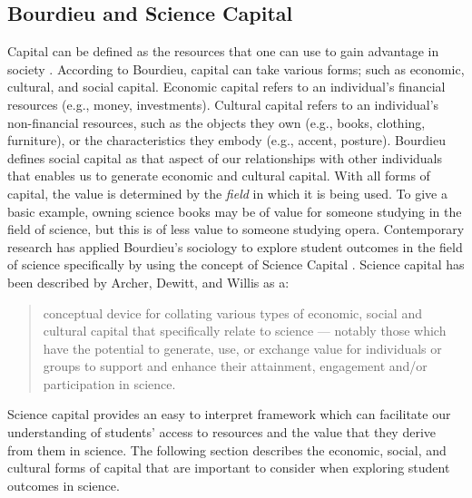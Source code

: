 \documentclass[smallextended]{svjour3}       %
\begin{document}
\subsection*{Bourdieu and Science Capital}
\label{sciencecapital}
Capital can be defined as the resources that one can use to gain advantage in society \cite{Bourdieu_1986}. According to Bourdieu, capital can take various forms; such as economic, cultural, and social capital. Economic capital refers to an individual's financial resources (e.g., money, investments). Cultural capital refers to an individual's non-financial resources, such as the objects they own (e.g., books, clothing, furniture), or the characteristics they embody (e.g., accent, posture). Bourdieu defines social capital as that aspect of our relationships with other individuals that enables us to generate economic and cultural capital. With all forms of capital, the value is determined by the \textit{field} in which it is being used. To give a basic example, owning science books may be of value for someone studying in the field of science, but this is of less value to someone studying opera. Contemporary research has applied Bourdieu's sociology to explore student outcomes in the field of science specifically by using the concept of Science Capital \cite{Archer_2015}. Science capital has been described by Archer, Dewitt, and Willis \citeyear{Archer2014} as a:
\begin{quote}
conceptual device for collating various types of economic, social and cultural capital that specifically relate to science --- notably those which have the potential to generate, use, or exchange value for individuals or groups to support and enhance their attainment, engagement and/or participation in science.
\end{quote}
Science capital provides an easy to interpret framework which can facilitate our understanding of students' access to resources and the value that they derive from them in science. The following section describes the economic, social, and cultural forms of capital that are important to consider when exploring student outcomes in science. 
\end{document}
